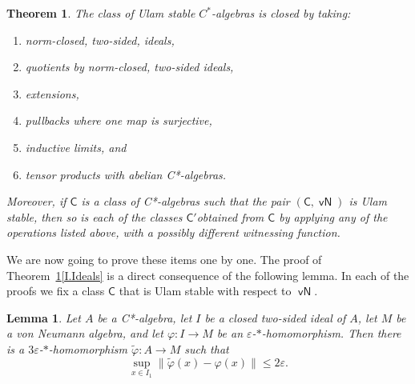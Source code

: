 \documentclass[11pt]{amsproc}
\newcommand{\cstar}{C*}
\newcommand{\sfC}{\mathsf C}
\DeclareMathOperator{\sfvN}{\mathsf {vN}}
\theoremstyle{definition}
\theoremstyle{plain}
\newtheorem{lemma}[definition]{Lemma}
\newtheorem{theorem}[definition]{Theorem}
\theoremstyle{remark}
\begin{document}
\begin{theorem}
\label{T.Closure}
The class of Ulam stable $C^*$-algebras is closed by taking:
\begin{enumerate}
\item \label{I.Ideals} norm-closed,  two-sided,  ideals,
\item \label{I.Quotients} quotients by norm-closed,  two-sided ideals,
\item \label{I.Extensions} extensions,
\item \label{I.Pullback} pullbacks where one map is surjective,
\item \label{thm:Johnson} inductive limits, and
\item \label{I.Tensor}tensor products with abelian \cstar-algebras.
\end{enumerate}
Moreover, if $\sfC$ is a class of \cstar-algebras such that the pair $(\sfC,\sfvN)$ is Ulam stable, then so is each of the classes $\sfC'$obtained from $\sfC$ by applying any of the operations listed above, with a possibly different witnessing function.
\end{theorem}

We are now going to prove these items one by one. The proof of Theorem~\ref{T.Closure}\eqref{I.Ideals} is a direct consequence of the following lemma.
In each of the proofs we fix a class $\sfC$ that is Ulam stable with respect to $\sfvN$. 

\begin{lemma}\label{L.extend.from.ideal}
Let $A$ be a \cstar-algebra, let $I$ be a closed two-sided ideal of $A$,
let $M$ be a von Neumann algebra, and let
$
\varphi\colon I\to M
$ 
be an $\varepsilon$-$*$-homomorphism.
Then there is a $3\varepsilon$-$*$-homomorphism
$
\widetilde\varphi\colon A\to M
$
such that
\[
\sup_{x\in I_1}\|\widetilde\varphi(x)-\varphi(x)\|
\leq 2\varepsilon.
\]
\end{lemma}
\end{document}
